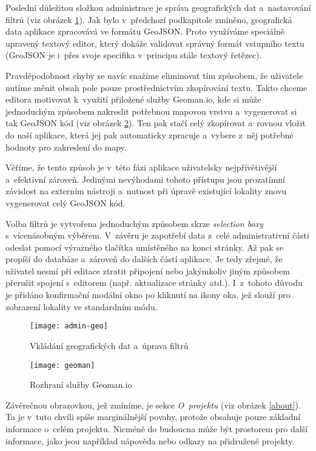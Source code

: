 Poslední důležitou složkou administrace je správa geografických dat a~nastavování filtrů (viz obrázek \ref{admin-geo}). Jak bylo v~předchozí podkapitole zmíněno, geografická data aplikace zpracovává ve formátu GeoJSON. Proto využíváme speciálně upravený textový editor, který dokáže validovat správný formát vstupního textu (GeoJSON je i~přes svoje specifika v~principu stále textový řetězec).

Pravděpodobnost chyby se navíc snažíme eliminovat tím způsobem, že uživatele nutíme měnit obsah pole pouze prostřednictvím zkopírování textu. Takto chceme editora motivovat k~využití přiložené služby Geoman.io, kde si může jednoduchým způsobem nakreslit potřebnou mapovou vrstvu a~vygenerovat si tak GeoJSON kód (viz obrázek \ref{geoman}). Ten pak stačí celý zkopírovat a~rovnou vložit do naší aplikace, která jej pak automaticky zpracuje a~vybere z~něj potřebné hodnoty pro zakreslení do mapy.

Věříme, že tento způsob je v~této fázi aplikace uživatelsky nejpřívětivější a~efektivní zároveň. Jedinými nevýhodami tohoto přístupu jsou prozatímní závislost na externím nástroji a~nutnost při úpravě existující lokality znovu vygenerovat celý GeoJSON kód.

Volba filtrů je vytvořena jednoduchým způsobem skrze \emph{selection boxy} s~vícenásobným výběrem. V~závěru je zapotřebí data z~celé administrativní části odeslat pomocí výrazného tlačítka umístěného na konci stránky. Až pak se propíší do databáze a~zároveň do dalších částí aplikace. Je tedy zřejmé, že uživatel nesmí při editace ztratit připojení nebo jakýmkoliv jiným způsobem přerušit spojení s~editorem (např. aktualizace stránky atd.). I~z~tohoto důvodu je přidáno konfirmační modální okno po kliknutí na ikony oka, jež slouží pro zobrazení lokality ve standardním módu.

\begin{figure}
    \centering
    \texttt{[image: admin-geo]}  
    \caption{Vkládání geografických dat a~úprava filtrů}
    \label{admin-geo}
\end{figure}

\begin{figure}
    \centering
    \texttt{[image: geoman]}  
    \caption{Rozhraní služby Geoman.io}
    \label{geoman}
\end{figure}

Závěrečnou obrazovkou, jež zmíníme, je sekce \emph{O~projektu} (viz obrázek \ref{about}). Ta je v~tuto chvíli spíše marginálnější povahy, protože obsahuje pouze základní informace o~celém projektu. Nicméně do budoucna může být prostorem pro další informace, jako jsou například nápověda nebo odkazy na přidružené projekty.

